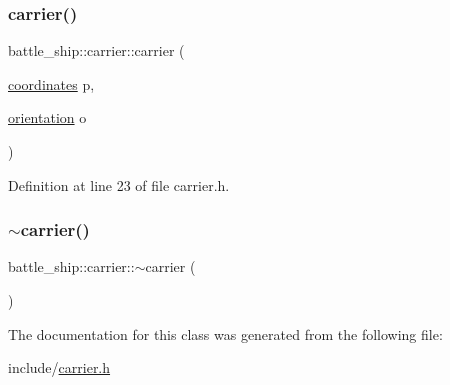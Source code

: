 \mbox{\label{classbattle__ship_1_1carrier_a3bb443575cd2f35ab21981b984c0fa02}} 
\subsubsection{\texorpdfstring{carrier()}{carrier()}\hspace{0.1cm}{\footnotesize\ttfamily [2/2]}}
{\footnotesize\ttfamily battle\+\_\+ship\+::carrier\+::carrier (\begin{DoxyParamCaption}\item[{\hyperlink{structbattle__ship_1_1coordinates}{coordinates}}]{p,  }\item[{\hyperlink{namespacebattle__ship_aed87488f0a73f0d0679fe343fb61c784}{orientation}}]{o }\end{DoxyParamCaption})\hspace{0.3cm}{\ttfamily [inline]}}



Definition at line 23 of file carrier.\+h.

\mbox{\label{classbattle__ship_1_1carrier_a3642e56afffedbe7e20af863d0dde697}} 
\subsubsection{\texorpdfstring{$\sim$carrier()}{~carrier()}}
{\footnotesize\ttfamily battle\+\_\+ship\+::carrier\+::$\sim$carrier (\begin{DoxyParamCaption}{ }\end{DoxyParamCaption})\hspace{0.3cm}{\ttfamily [default]}}



The documentation for this class was generated from the following file\+:\begin{DoxyCompactItemize}
\item 
include/\hyperlink{carrier_8h}{carrier.\+h}\end{DoxyCompactItemize}
